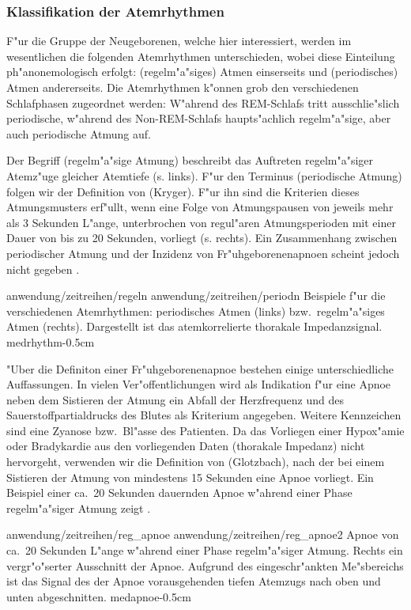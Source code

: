 \subsubsection{Klassifikation der Atemrhythmen}
F"ur die Gruppe der Neugeborenen, welche hier interessiert, werden im wesentlichen die
folgenden Atemrhythmen unterschieden, wobei diese Einteilung ph"anonemologisch erfolgt:
\begriff(regelm"a"siges) Atmen einserseits und \begriff(periodisches) Atmen andererseits.
Die Atemrhythmen k"onnen grob den verschiedenen Schlafphasen zugeordnet werden: W"ahrend
des REM-Schlafs tritt ausschlie"slich periodische, w"ahrend des Non-REM-Schlafs
haupts"achlich regelm"a"sige, aber auch periodische Atmung auf.

Der Begriff \begriff(regelm"a"sige Atmung) beschreibt das Auftreten regelm"a"siger
Atemz"uge gleicher Atemtiefe (s.  links). F"ur den Terminus
\begriff(periodische Atmung) folgen wir der Definition von \autor(Kryger). F"ur ihn sind
die Kriterien dieses Atmungsmusters erf"ullt, wenn eine Folge von Atmungspausen von
jeweils mehr als 3 Sekunden L"ange, unterbrochen von regul"aren Atmungsperioden mit einer
Dauer von bis zu 20 Sekunden, vorliegt (s.  rechts). Ein Zusammenhang
zwischen periodischer Atmung und der Inzidenz von Fr"uhgeborenenapnoen scheint jedoch
nicht gegeben \cite{Hoch96}.

\epsfigdouble
{anwendung/zeitreihen/regeln}
{anwendung/zeitreihen/periodn}
{Beispiele f"ur die verschiedenen Atemrhythmen: periodisches Atmen (links) bzw.\  
  regelm"a"siges Atmen (rechts). Dargestellt ist das atemkorrelierte thorakale
  Impedanzsignal.  }{medrhythm}{-0.5cm}

"Uber die Definiton einer Fr"uhgeborenenapnoe bestehen einige unterschiedliche
Auffassungen. In vielen Ver"offentlichungen wird als Indikation f"ur eine Apnoe neben dem Sistieren der
Atmung  ein Abfall der Herzfrequenz und des Sauerstoffpartialdrucks des Blutes als
Kriterium angegeben\cite{Poets93}. Weitere Kennzeichen sind eine Zyanose bzw.\  Bl"asse
des Patienten. Da das Vorliegen einer Hypox"amie oder Bradykardie aus den vorliegenden
Daten (thorakale Impedanz) nicht hervorgeht, verwenden wir die Definition von
\autor(Glotzbach), nach der bei einem Sistieren der Atmung von mindestens 15 Sekunden eine 
Apnoe vorliegt.  Ein Beispiel einer ca.\ 20 Sekunden dauernden Apnoe w"ahrend einer Phase
regelm"a"siger Atmung zeigt \psref{medapnoe}.

\epsfigdouble
{anwendung/zeitreihen/reg_apnoe}
{anwendung/zeitreihen/reg_apnoe2}
{ Apnoe von ca.\  20 Sekunden L"ange w"ahrend einer Phase regelm"a"siger Atmung. Rechts
  ein vergr"o"serter Ausschnitt der Apnoe. Aufgrund des eingeschr"ankten Me"sbereichs ist
  das Signal des der Apnoe vorausgehenden tiefen Atemzugs nach oben und unten abgeschnitten.
}{medapnoe}{-0.5cm}


